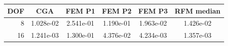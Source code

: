 \begin{tabular}{rccccc}
\toprule
DOF & CGA & FEM P1 & FEM P2 & FEM P3 & RFM median \\
\midrule
8 & 1.028e-02 & 2.541e-01 & 1.190e-01 & 1.963e-02 & 1.426e-02 \\
16 & 1.241e-03 & 1.300e-01 & 4.376e-02 & 4.234e-03 & 1.357e-03 \\
\bottomrule
\end{tabular}
